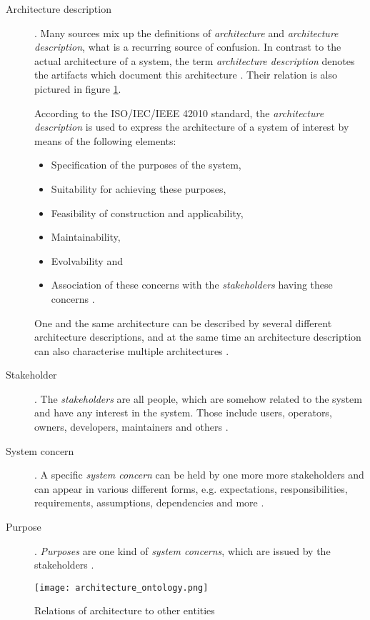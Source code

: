 \begin{description}
\item [Architecture description].
	Many sources mix up the definitions of \emph{architecture} and \emph{architecture description}, what is a recurring source of confusion. In contrast to the actual architecture of a system, the term \emph{architecture description} denotes the artifacts which document this architecture \cite{ISO_42010}. Their relation is also pictured in figure \ref{fig:architecture_ontology}.

	According to the ISO/IEC/IEEE 42010 standard, the \emph{architecture description} is used to express the architecture of a system of interest by means of the following elements:
	\begin{itemize}
	\item Specification of the purposes of the system,
	\item Suitability for achieving these purposes,
	\item Feasibility of construction and applicability,
	\item Maintainability,
	\item Evolvability and
	\item Association of these concerns with the \emph{stakeholders} having these concerns \cite{ISO_42010}.
	\end{itemize}
	One and the same architecture can be described by several different architecture descriptions, and at the same time an architecture description can also characterise multiple architectures \cite{ISO_42010}.

\item [Stakeholder].
	The \emph{stakeholders} are all people, which are somehow related to the system and have any interest in the system. Those include users, operators, owners, developers, maintainers and others \cite{ISO_42010}.

\item [System concern].
	A specific \emph{system concern} can be held by one more more stakeholders and can appear in various different forms, e.g. expectations, responsibilities, requirements, assumptions, dependencies and more \cite{ISO_42010}. 

\item [Purpose].
	\emph{Purposes} are one kind of \emph{system concerns}, which are issued by the stakeholders \cite{ISO_42010}.
\end{description}

\begin{figure}[ht]
\centering
\texttt{[image: architecture\_ontology.png]}
\caption{Relations of architecture to other entities \cite{ISO_42010}}
\label{fig:architecture_ontology}
\end{figure}










